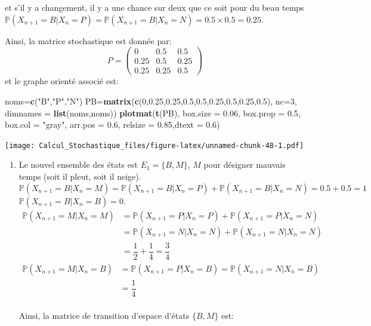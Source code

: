 \documentclass[
]{book}
\newenvironment{Shaded}{\begin{snugshade}}{\end{snugshade}}
\newcommand{\DataTypeTok}[1]{\textcolor[rgb]{0.13,0.29,0.53}{#1}}
\newcommand{\DecValTok}[1]{\textcolor[rgb]{0.00,0.00,0.81}{#1}}
\newcommand{\FloatTok}[1]{\textcolor[rgb]{0.00,0.00,0.81}{#1}}
\newcommand{\KeywordTok}[1]{\textcolor[rgb]{0.13,0.29,0.53}{\textbf{#1}}}
\newcommand{\NormalTok}[1]{#1}
\newcommand{\StringTok}[1]{\textcolor[rgb]{0.31,0.60,0.02}{#1}}
\providecommand{\tightlist}{%
  \setlength{\itemsep}{0pt}\setlength{\parskip}{0pt}}
\theoremstyle{definition}
\theoremstyle{definition}
\theoremstyle{definition}
\theoremstyle{remark}
\begin{document}
et s'il y a changement, il y a une chance sur deux que ce soit pour du beau temps \(\mathbb{P}(X_{n+1}=B|X_n=P)=\mathbb{P}(X_{n+1}=B|X_n=N)=0.5\times 0.5=0.25\).

Ainsi, la matrice stochastique est donnée par:
\[
  P=\left( 
  \begin{array}{ccc}
  0 & 0.5 & 0.5\\
  0.25 & 0.5 & 0.25\\
  0.25 & 0.25 & 0.5
  \end{array}
  \right)
  \]
et le graphe orienté associé est:

\begin{Shaded}
\begin{Highlighting}[]
\NormalTok{noms=}\KeywordTok{c}\NormalTok{(}\StringTok{"B"}\NormalTok{,}\StringTok{"P"}\NormalTok{,}\StringTok{"N"}\NormalTok{)}
\NormalTok{PB=}\KeywordTok{matrix}\NormalTok{(}\KeywordTok{c}\NormalTok{(}\DecValTok{0}\NormalTok{,}\FloatTok{0.25}\NormalTok{,}\FloatTok{0.25}\NormalTok{,}\FloatTok{0.5}\NormalTok{,}\FloatTok{0.5}\NormalTok{,}\FloatTok{0.25}\NormalTok{,}\FloatTok{0.5}\NormalTok{,}\FloatTok{0.25}\NormalTok{,}\FloatTok{0.5}\NormalTok{), }\DataTypeTok{nc=}\DecValTok{3}\NormalTok{,}
          \DataTypeTok{dimnames =} \KeywordTok{list}\NormalTok{(noms,noms))}
\KeywordTok{plotmat}\NormalTok{(}\KeywordTok{t}\NormalTok{(PB), }\DataTypeTok{box.size =} \FloatTok{0.06}\NormalTok{, }\DataTypeTok{box.prop =} \FloatTok{0.5}\NormalTok{, }\DataTypeTok{box.col =} \StringTok{"gray"}\NormalTok{, }
          \DataTypeTok{arr.pos =} \FloatTok{0.6}\NormalTok{, }\DataTypeTok{relsize =} \FloatTok{0.85}\NormalTok{,}\DataTypeTok{dtext =} \FloatTok{0.6}\NormalTok{)}
\end{Highlighting}
\end{Shaded}

\texttt{[image: Calcul\_Stochastique\_files/figure-latex/unnamed-chunk-48-1.pdf]}

\begin{enumerate}
\def\labelenumi{\arabic{enumi}.}
\setcounter{enumi}{1}
\tightlist
\item
  Le nouvel ensemble des états est \(E_1=\{B, M \}\), \(M\) pour désigner mauvais temps (soit il pleut, soit il neige).
  \[\mathbb{P}(X_{n+1}=B|X_n=M)=\mathbb{P}(X_{n+1}=B|X_n=P)+\mathbb{P}(X_{n+1}=B|X_n=N)=0.5+0.5=1\]
  \(\mathbb{P}(X_{n+1}=B|X_n=B)=0\).
  \begin{align*} 
    \mathbb{P}(X_{n+1}=M|X_n=M)&=\mathbb{P}(X_{n+1}=P|X_n=P)+\mathbb{P}(X_{n+1}=P|X_n=N)\\
    & = \mathbb{P}(X_{n+1}=N|X_n=N)+\mathbb{P}(X_{n+1}=N|X_n=N)\\
    &= \dfrac{1}{2}+\dfrac{1}{4}= \dfrac{3}{4}
    \end{align*}
  \begin{align*} 
    \mathbb{P}(X_{n+1}=M|X_n=B)&=\mathbb{P}(X_{n+1}=P|X_n=B)=\mathbb{P}(X_{n+1}=N|X_n=B)\\
    &= \dfrac{1}{4}
    \end{align*}\\
  Ainsi, la matrice de transition d'espace d'états \(\{B,M\}\) est:
\end{enumerate}
\end{document}
